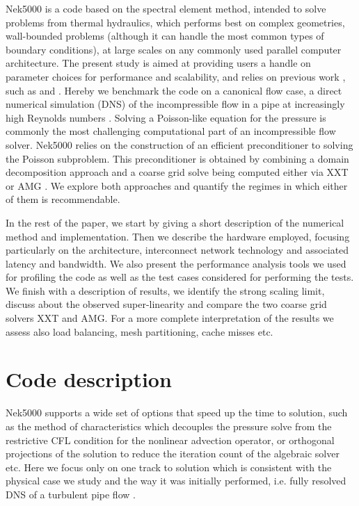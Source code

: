 \documentclass{sig-alternate}
\begin{document}
Nek5000 is a code based on the spectral element method, intended to solve problems
from thermal hydraulics, which performs best on
complex geometries, wall-bounded problems (although it can handle the most common types of
boundary conditions), at large scales on any commonly used parallel computer
architecture. The present study is aimed at providing users a handle on
parameter choices for performance and scalability, and relies on previous work ,
such as \cite{fischer:scaling} and \cite{tufo:terascale}. Hereby we benchmark
the code on a canonical flow case, a direct numerical simulation (DNS) of
the incompressible flow in a pipe at increasingly high Reynolds numbers
\cite{Khoury2013}. Solving a Poisson-like equation for the
pressure is commonly the most challenging computational part of an incompressible flow
solver. Nek5000 relies on the construction of an efficient preconditioner to solving the Poisson
subproblem. This preconditioner is obtained by combining a domain decomposition 
approach and a coarse grid solve being computed either via XXT \cite{Tufo2001151} 
or AMG \cite{LottesAMG}. We explore both 
approaches and quantify the regimes in which either of them is recommendable. 

In the rest of the paper, we start by giving a short description of the numerical method
and implementation. Then we describe the hardware employed, focusing particularly on
the architecture, interconnect network technology and associated latency and
bandwidth. We also present the performance analysis tools we used for profiling the code
as well as the test cases considered for performing the tests. We finish with a 
description of results, we identify the strong scaling limit, discuss about the
observed super-linearity and compare the two coarse grid solvers XXT and AMG. For 
a more complete interpretation of the results we assess also load balancing, 
mesh partitioning, cache misses etc. 


\section{Code description}
Nek5000 supports a wide set of options that speed up the time to solution, such
as the method of characteristics which decouples the pressure solve from the
restrictive CFL condition for the nonlinear advection operator, or orthogonal
projections of the solution to reduce the iteration count of the algebraic
solver etc. Here we focus only on one track to solution which is consistent with
the physical case we study and the way it was initially performed, i.e. fully 
resolved DNS of a turbulent pipe flow \cite{Khoury2013}.
\end{document}
